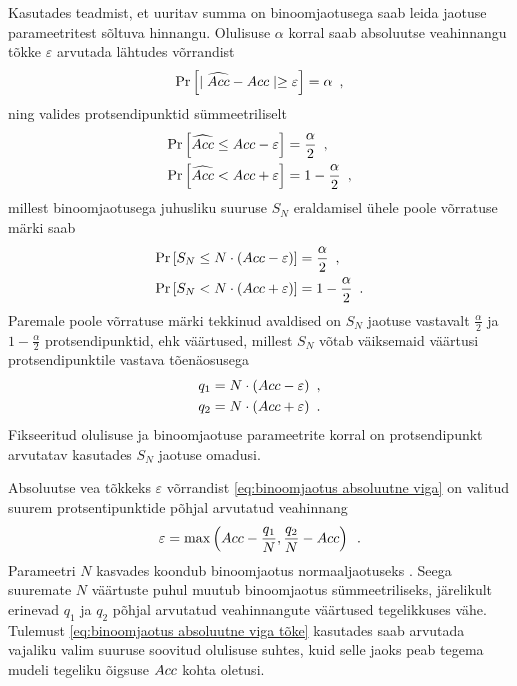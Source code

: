 Kasutades teadmist, et uuritav summa on binoomjaotusega saab leida jaotuse parameetritest sõltuva hinnangu. Olulisuse $\alpha$ korral saab absoluutse veahinnangu tõkke $\varepsilon$ arvutada lähtudes võrrandist
\begin{equation}
    \label{eq:binoomjaotus absoluutne viga}
    \Pr\left[\mid\widehat{Acc}-Acc\mid\geq\varepsilon\right]=\alpha \enspace,
\end{equation}
ning valides protsendipunktid sümmeetriliselt
\begin{align*}
    \Pr\left[\widehat{Acc} \leq Acc-\varepsilon\right] &= \frac{\alpha}{2} \enspace,\\
    \Pr\left[\widehat{Acc} <    Acc+\varepsilon\right] &= 1 - \frac{\alpha}{2} \enspace,
\end{align*}
millest binoomjaotusega juhusliku suuruse $S_N$ eraldamisel ühele poole võrratuse märki saab
\begin{align*}
    \Pr\left[S_N \leq N \cdot(Acc-\varepsilon)\right] &= \frac{\alpha}{2} \enspace,\\
    \Pr\left[S_N < N \cdot(Acc+\varepsilon)\right] &= 1 - \frac{\alpha}{2} \enspace.
\end{align*}
Paremale poole võrratuse märki tekkinud avaldised on $S_N$ jaotuse vastavalt $\frac{\alpha}{2}$ ja $1-\frac{\alpha}{2}$ protsendipunktid, ehk väärtused, millest $S_N$ võtab väiksemaid väärtusi protsendipunktile vastava tõenäosusega
\begin{align*}
    q_1 &= N \cdot(Acc-\varepsilon) \enspace, \\
    q_2 &= N \cdot(Acc+\varepsilon) \enspace. \\
\end{align*}
Fikseeritud olulisuse ja binoomjaotuse parameetrite korral on protsendipunkt arvutatav kasutades $S_N$ jaotuse omadusi. 

Absoluutse vea tõkkeks $\varepsilon$ võrrandist \eqref{eq:binoomjaotus absoluutne viga} on valitud suurem protsentipunktide põhjal arvutatud veahinnang
\begin{equation}
    \label{eq:binoomjaotus absoluutne viga tõke}
    \varepsilon = \max \left( Acc - \frac{q_1}{N} , \frac{q_2}{N} - Acc \right) \enspace.
\end{equation}
Parameetri $N$ kasvades koondub binoomjaotus normaaljaotuseks \cite{tõenäosusteooria-algkursus}. Seega suuremate $N$ väärtuste puhul muutub binoomjaotus sümmeetriliseks, järelikult erinevad $q_1$ ja $q_2$ põhjal arvutatud veahinnangute väärtused tegelikkuses vähe. Tulemust \eqref{eq:binoomjaotus absoluutne viga tõke} kasutades saab arvutada vajaliku valim suuruse soovitud olulisuse suhtes, kuid selle jaoks peab tegema mudeli tegeliku õigsuse $Acc$ kohta oletusi.

